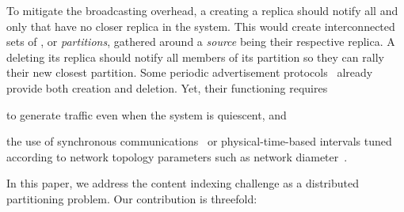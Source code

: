 To mitigate the broadcasting overhead, a \process creating a replica
should notify all and only \processes that have no closer replica in
the system. This would create interconnected sets of \processes, or
\emph{partitions}, gathered around a \emph{source} being their
respective replica. A \process deleting its replica should notify all
members of its partition so they can rally their new
closest partition.
%
Some periodic advertisement
protocols~\cite{hemmati2015namebased,sohier2012physarum} already
provide both creation and deletion. Yet, their functioning
requires
\begin{inparaenum}[(i)]
\item to generate traffic even when the system is quiescent, and
\item the use of synchronous communications~\cite{sohier2012physarum}
  or physical-time-based intervals tuned according to network topology
  parameters such as network diameter~\cite{hemmati2015namebased}.
\end{inparaenum}


\noindent In this paper, we address the content indexing challenge as
a distributed partitioning problem. Our contribution is threefold:


